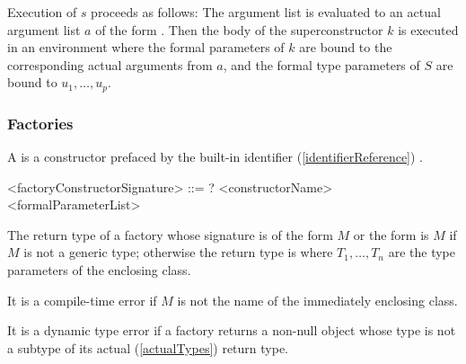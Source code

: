 \documentclass[makeidx]{article}
\begin{document}
\LMHash{}%
Execution of $s$ proceeds as follows:
The argument list
is evaluated to an actual argument list $a$ of the form
.
Then the body of the superconstructor $k$ is executed
in an environment where the formal parameters of $k$ are bound to
the corresponding actual arguments from $a$,
and the formal type parameters of $S$ are bound to $u_1, \ldots, u_p$.


\subsubsection{Factories}

\LMHash{}%
A 
is a constructor prefaced by the built-in identifier
(\ref{identifierReference})
\FACTORY{}.

\begin{grammar}
<factoryConstructorSignature> ::= \gnewline{}
  \CONST? \FACTORY{} <constructorName> <formalParameterList>
\end{grammar}


\LMHash{}%
The return type of a factory whose signature is of the form \FACTORY{} $M$ or the form \FACTORY{}  is $M$ if $M$ is not a generic type;
otherwise the return type is  where $T_1, \ldots, T_n$ are the type parameters of the enclosing class.

\LMHash{}%
It is a compile-time error if $M$ is not the name of the immediately enclosing class.

\LMHash{}%
It is a dynamic type error if a factory returns a non-null object
whose type is not a subtype of its actual
(\ref{actualTypes})
return type.


\end{document}

